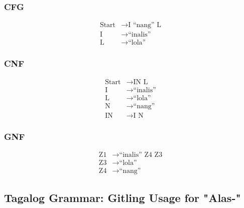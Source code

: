 \subsubsection{CFG}
\begin{equation*}
    \begin{aligned}
        \text{Start}   & \rightarrow \text{I “nang” L}   \\
        \text{I} & \rightarrow \text{“inalis”} \\
        \text{L} & \rightarrow \text{“lola”}
    \end{aligned}
\end{equation*}

\subsubsection{CNF}
\begin{equation*}
    \begin{aligned}
        \text{Start}   & \rightarrow \text{IN L}   \\
        \text{I} & \rightarrow \text{“inalis”} \\
        \text{L} & \rightarrow \text{“lola”} \\
        \text{N} & \rightarrow \text{“nang”} \\
        \text{IN} & \rightarrow \text{I N}
    \end{aligned}
\end{equation*}

\subsubsection{GNF}
\begin{equation*}
    \begin{aligned}
        \text{Z1}   & \rightarrow \text{“inalis” Z4 Z3}   \\
        \text{Z3} & \rightarrow \text{“lola”} \\
        \text{Z4} & \rightarrow \text{“nang”}
    \end{aligned}
\end{equation*}

\subsection{Tagalog Grammar: Gitling Usage for "Alas-"}
